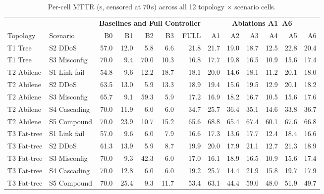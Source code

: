 \documentclass[sn-mathphys,Numbered]{sn-jnl}
\begin{document}
\begin{appendices}
\begin{table}[h]\centering\scriptsize\setlength{\tabcolsep}{3pt}
\caption{Per-cell MTTR (s, censored at 70\,s) across all 12 topology $\times$ scenario cells.}\label{tab:percell_mttr}%
\begin{adjustbox}{max width=\textwidth,center}
\begin{tabular}{llrrrrr@{\hspace{12pt}}rrrrrr}
\toprule
& & \multicolumn{5}{c}{\textbf{Baselines and Full Controller}} & \multicolumn{6}{c}{\textbf{Ablations A1--A6}} \\
\cmidrule(lr){3-7}\cmidrule(lr){8-13}
Topology & Scenario & B0 & B1 & B2 & B3 & FULL & A1 & A2 & A3 & A4 & A5 & A6 \\
\midrule
T1 Tree & S2 DDoS & 57.0 & 12.0 & 5.8 & 6.6 & 21.8 & 21.7 & 19.0 & 18.7 & 12.5 & 22.8 & 20.4 \\
T1 Tree & S3 Misconfig & 70.0 & 9.4 & 70.0 & 10.3 & 16.8 & 17.7 & 19.8 & 16.5 & 10.9 & 15.6 & 17.4 \\
\midrule
T2 Abilene & S1 Link fail & 54.8 & 9.6 & 12.2 & 18.7 & 18.1 & 20.0 & 14.6 & 18.1 & 11.2 & 20.1 & 18.0 \\
T2 Abilene & S2 DDoS & 63.5 & 13.0 & 5.9 & 13.3 & 18.9 & 19.4 & 15.6 & 19.5 & 12.9 & 20.1 & 18.2 \\
T2 Abilene & S3 Misconfig & 65.7 & 9.1 & 59.3 & 5.9 & 17.2 & 16.9 & 18.2 & 16.7 & 10.5 & 15.6 & 17.6 \\
T2 Abilene & S4 Cascading & 70.0 & 11.9 & 6.0 & 6.0 & 34.7 & 25.7 & 36.4 & 35.1 & 14.6 & 33.8 & 36.7 \\
T2 Abilene & S5 Compound & 70.0 & 23.9 & 10.7 & 15.2 & 65.6 & 68.8 & 65.4 & 67.4 & 60.1 & 67.6 & 66.8 \\
\midrule
T3 Fat-tree & S1 Link fail & 57.0 & 9.6 & 6.0 & 7.9 & 16.6 & 17.3 & 13.6 & 17.7 & 12.4 & 18.4 & 16.6 \\
T3 Fat-tree & S2 DDoS & 61.3 & 13.9 & 5.9 & 8.7 & 19.9 & 20.0 & 17.9 & 21.1 & 12.7 & 21.3 & 18.9 \\
T3 Fat-tree & S3 Misconfig & 70.0 & 9.3 & 42.3 & 6.0 & 17.0 & 16.1 & 18.9 & 16.5 & 10.9 & 15.6 & 17.4 \\
T3 Fat-tree & S4 Cascading & 70.0 & 12.8 & 6.0 & 6.0 & 19.2 & 25.7 & 14.4 & 21.9 & 15.8 & 19.7 & 17.9 \\
T3 Fat-tree & S5 Compound & 70.0 & 25.4 & 9.3 & 11.7 & 53.4 & 63.1 & 44.4 & 59.0 & 48.0 & 51.9 & 49.7 \\
\bottomrule
\end{tabular}
\end{adjustbox}
\end{table}


\end{appendices}
\end{document}
